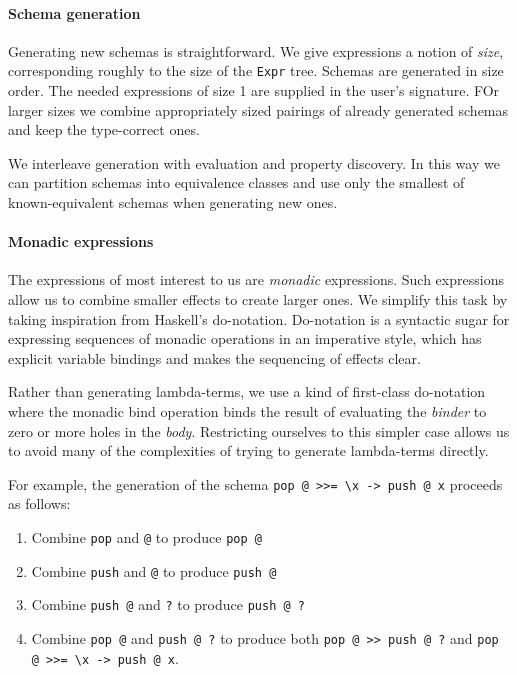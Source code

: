 \paragraph{Schema generation}
Generating new schemas is straightforward.  We give expressions a
notion of \emph{size}, corresponding roughly to the size of the
\verb|Expr| tree.  Schemas are generated in size order.  The needed
expressions of size 1 are supplied in the user's signature.  FOr
larger sizes we combine appropriately sized pairings of already
generated schemas and keep the type-correct ones.

We interleave generation with evaluation and property discovery.  In
this way we can partition schemas into equivalence classes and use
only the smallest of known-equivalent schemas when generating new
ones.

\paragraph{Monadic expressions}
The expressions of most interest to us are \emph{monadic} expressions.
Such expressions allow us to combine smaller effects to create larger
ones.  We simplify this task by taking inspiration from Haskell's
do-notation.  Do-notation is a syntactic sugar for expressing
sequences of monadic operations in an imperative style, which has
explicit variable bindings and makes the sequencing of effects clear.

Rather than generating lambda-terms, we use a kind of first-class
do-notation where the monadic bind operation binds the result of
evaluating the \emph{binder} to zero or more holes in the \emph{body}.
Restricting ourselves to this simpler case allows us to avoid many of
the complexities of trying to generate lambda-terms directly.

For example, the generation of the schema
\verb|pop @ >>= \x -> push @ x| proceeds as follows:

\begin{enumerate}
\item Combine \verb|pop| and \verb|@| to produce \verb|pop @|
\item Combine \verb|push| and \verb|@| to produce \verb|push @|
\item Combine \verb|push @| and \verb|?| to produce \verb|push @ ?|
\item Combine \verb|pop @| and \verb|push @ ?| to produce both
  \verb|pop @ >> push @ ?| and \verb|pop @ >>= \x -> push @ x|.
\end{enumerate}

